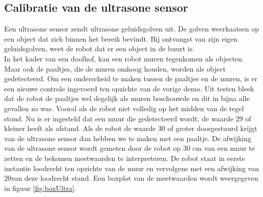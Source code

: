 \documentclass[tt3]{penoverslag}
\newcommand{\boxplot}[6]{%
	\filldraw[fill=white,line width=0.2mm] let \n{boxxl}={#1-0.1}, \n{boxxr}={#1+0.1} in (axis cs:\n{boxxl},#3) rectangle (axis cs:\n{boxxr},#4);   %
	\draw[line width=0.2mm, color=red] let \n{boxxl}={#1-0.1}, \n{boxxr}={#1+0.1} in (axis cs:\n{boxxl},#2) -- (axis cs:\n{boxxr},#2);             %
	\draw[line width=0.2mm] (axis cs:#1,#4) -- (axis cs:#1,#6);                                                                           %
	\draw[line width=0.2mm] let \n{whiskerl}={#1-0.025}, \n{whiskerr}={#1+0.025} in (axis cs:\n{whiskerl},#6) -- (axis cs:\n{whiskerr},#6);        %
	\draw[line width=0.2mm] (axis cs:#1,#3) -- (axis cs:#1,#5);                                                                           %
	\draw[line width=0.2mm] let \n{whiskerl}={#1-0.025}, \n{whiskerr}={#1+0.025} in (axis cs:\n{whiskerl},#5) -- (axis cs:\n{whiskerr},#5);        %
	}
\begin{document}
\tikzset{external/remake next}
\begin{center}
\end{center}

\subsection{Calibratie van de ultrasone sensor} %
\label{ssec:calibUS}
Een ultrasone sensor zendt ultrasone geluidsgolven uit. De golven weerkaatsen op een object dat zich binnen het bereik bevindt. Bij ontvangst van zijn eigen geluidsgolven, weet de robot dat er een object in de buurt is.\\

In het kader van een doolhof, kan een robot muren tegenkomen als objecten. Maar ook de paaltjes, die de muren omhoog houden, worden als object gedetecteerd. Om een onderscheid te maken tussen de paaltjes en de muren, is er een nieuwe controle ingevoerd ten opzichte van de vorige demo. Uit testen bleek dat de robot de paaltjes wel degelijk als muren beschouwde en dit in bijna alle gevallen zo was. Vooral als de robot niet volledig op het midden van de tegel stond. Nu is er ingesteld dat een muur die gedetecteerd wordt, de waarde 29 of kleiner heeft als afstand. Als de robot de waarde 30 of groter doorgestuurd krijgt van de ultrasone sensor dan hebben we te maken met een paaltje.
De afwijking van de ultrasone sensor wordt gemeten door de robot op 30 cm van een muur te zetten en de bekomen meetwaarden te interpreteren. De robot staat in eerste instantie loodrecht ten opzichte van de muur en vervolgens met een afwijking van 20\degree van deze loodrecht stand. Een boxplot van de meetwaarden wordt weergegeven in figuur \ref{fig:boxUltra}.

\tikzset{external/remake next}
\begin{center}
\end{center}
\end{document}
